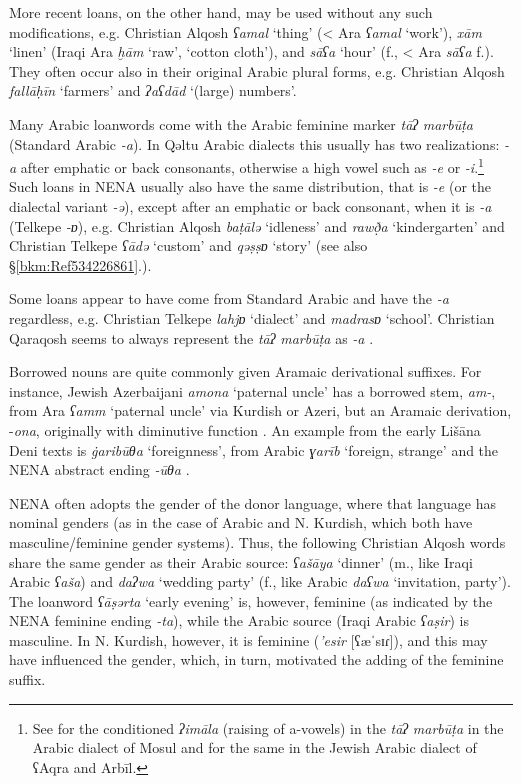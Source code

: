 \documentclass[output=paper]{langsci/langscibook}
\begin{document}
More recent loans, on the other hand, may be used without any such modifications, e.g. Christian Alqosh \textit{ʕamal} ‘thing’ (< Ara \textit{ʕamal} ‘work’), \textit{xām} ‘linen’ (Iraqi Ara \textit{ḫām} ‘raw’, ‘cotton cloth’), and \textit{sāʕa} ‘hour’ (f., < Ara \textit{sāʕa} f.). They often occur also in their original Arabic plural forms, e.g. Christian Alqosh \textit{fallāḥīn} ‘farmers’ and \textit{ʔaʕdād} ‘(large) numbers’. 

Many Arabic loanwords come with the Arabic feminine marker \textit{tāʔ} \textit{marbūṭa} (Standard Arabic \textit{\nobreakdash-a}). In Qəltu Arabic dialects this usually has two realizations: \textit{\nobreakdash-a} after emphatic or back consonants, otherwise a high vowel such as \textit{\nobreakdash-e} or \textit{\nobreakdash-i}.\footnote{See \citet[40]{Jastrow1979} for the conditioned \textit{ʔimāla} (raising of a-vowels) in the \textit{tāʔ} \textit{marbūṭa} in the Arabic dialect of Mosul and \citet[70]{Jastrow1990} for the same in the Jewish Arabic dialect of ʕAqra and Arbīl.} Such loans in NENA usually also have the same distribution, that is \textit{{}-e} (or the dialectal variant \textit{-ə}), except after an emphatic or back consonant, when it is \textit{\nobreakdash-a} (Telkepe \textit{\nobreakdash-ɒ}), e.g. Christian Alqosh \textit{baṭālə} ‘idleness’ and \textit{rawð̣a} ‘kindergarten’ and Christian Telkepe \textit{ʕādə} ‘custom’ and \textit{qəṣṣɒ} ‘story’ (see also §\ref{bkm:Ref534226861}.).

Some loans appear to have come from Standard Arabic and have the \textit{\nobreakdash-a} regardless, e.g. Christian Telkepe \textit{lahjɒ} ‘dialect’ and \textit{madrasɒ} ‘school’. Christian Qaraqosh seems to always represent the \textit{tāʔ} \textit{marbūṭa} as \textit{{}-a} \citep[204]{Khan2002}.

Borrowed nouns are quite commonly given Aramaic derivational suffixes. For instance, Jewish Azerbaijani \textit{amona} ‘paternal uncle’ has a borrowed stem, \textit{am-}, from Ara \textit{ʕamm} ‘paternal uncle’ via Kurdish or Azeri, but an Aramaic derivation, \nobreakdash-\textit{ona}, originally with diminutive function \citep[165]{Garbell1965}. An example from the early Lišāna Deni texts is \textit{\.garibūθa} ‘foreignness’, from Arabic \textit{ɣarīb} ‘foreign, strange’ and the NENA abstract ending \textit{{}-ūθa} \citep[205]{Sabar1984}.

NENA often adopts the gender of the donor language, where that language has nominal genders (as in the case of Arabic and N. Kurdish, which both have masculine/feminine gender systems). Thus, the following Christian Alqosh words share the same gender as their Arabic source: \textit{ʕašāya} ‘dinner’ (m., like Iraqi Arabic \textit{ʕaša}) and \textit{daʔwa} ‘wedding party’ (f., like Arabic \textit{daʕwa} ‘invitation, party’). The loanword \textit{ʕāṣərta} ‘early evening’ is, however, feminine (as indicated by the NENA feminine ending \textit{{}-ta}), while the Arabic source (Iraqi Arabic \textit{ʕaṣir}) is masculine. In N. Kurdish, however, it is feminine (\textit{{}'esir} [ʕæˈsɪɾ]), and this may have influenced the gender, which, in turn, motivated the adding of the feminine suffix.
\end{document}
